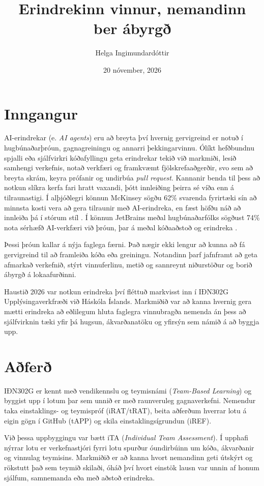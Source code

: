 \documentclass{kennsluakademia_conf}
\date{20 nóvember, 2026}
\title{Erindrekinn vinnur, nemandinn ber ábyrgð}
\author{%
Helga Ingimundardóttir%
}
\affil{}{Iðnaðarverkfræði, Háskóli Íslands}
\begin{document}
\maketitle


\section{Inngangur}\label{inngangur}

AI-erindrekar (e. \emph{AI agents}) eru að breyta því hvernig
gervigreind er notuð í hugbúnaðarþróun, gagnagreiningu og annarri
þekkingarvinnu. Ólíkt hefðbundnu spjalli eða sjálfvirkri kóðafyllingu
geta erindrekar tekið við markmiði, lesið samhengi verkefnis, notað
verkfæri og framkvæmt fjölskrefaaðgerðir, svo sem að breyta skrám, keyra
prófanir og undirbúa \emph{pull request}. Kannanir benda til þess að
notkun slíkra kerfa fari hratt vaxandi, þótt innleiðing þeirra sé víða
enn á tilraunastigi. Í alþjóðlegri könnun McKinsey sögðu 62\% svarenda
fyrirtæki sín að minnsta kosti vera að gera tilraunir með AI-erindreka,
en fæst höfðu náð að innleiða þá í stórum stíl \citep{mckinsey2025}. Í
könnun JetBrains meðal hugbúnaðarfólks sögðust 74\% nota sérhæfð
AI-verkfæri við þróun, þar á meðal kóðaaðstoð og erindreka
\citep{jetbrains2026}.

Þessi þróun kallar á nýja faglega færni. Það nægir ekki lengur að kunna
að fá gervigreind til að framleiða kóða eða greiningu. Notandinn þarf
jafnframt að geta afmarkað verkefnið, stýrt vinnuferlinu, metið og
sannreynt niðurstöður og borið ábyrgð á lokaafurðinni.

Haustið 2026 var notkun erindreka því fléttuð markvisst inn í IÐN302G
Upplýsingaverkfræði við Háskóla Íslands. Markmiðið var að kanna hvernig
gera mætti erindreka að eðlilegum hluta faglegra vinnubragða nemenda án
þess að sjálfvirknin tæki yfir þá hugsun, ákvarðanatöku og yfirsýn sem
námið á að byggja upp.

\section{Aðferð}\label{auxf0feruxf0}

IÐN302G er kennt með vendikennslu og teymisnámi (\emph{Team-Based
Learning}) og byggist upp í lotum þar sem unnið er með raunveruleg
gagnaverkefni. Nemendur taka einstaklings- og teymispróf (iRAT/tRAT),
beita aðferðum hverrar lotu á eigin gögn í GitHub (tAPP) og skila
einstaklingsígrundun (iREF).

Við þessa uppbyggingu var bætt iTA (\emph{Individual Team Assessment}).
Í upphafi nýrrar lotu er verkefnastjóri fyrri lotu spurður óundirbúinn
um kóða, ákvarðanir og vinnulag teymisins. Markmiðið er að kanna hvort
nemandinn geti útskýrt og rökstutt það sem teymið skilaði, óháð því
hvort einstök lausn var unnin af honum sjálfum, samnemanda eða með
aðstoð erindreka.
\end{document}
